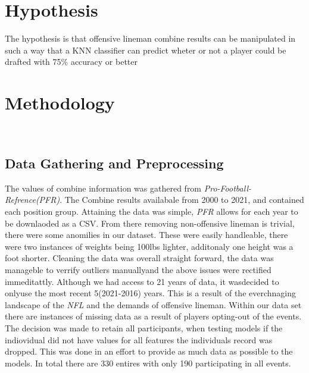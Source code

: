 \documentclass[confrence]{IEEEtran}
\begin{document}
\section*{Hypothesis}
The hypothesis is that offensive lineman combine results can be manipulated in such a way that a KNN classifier can predict wheter or not a player could be drafted with 75\% accuracy or better
\\
\section*{Methodology}
\\
\subsection*{Data Gathering and Preprocessing}
The values of combine information was gathered from \textit{Pro-Football-Refrence(PFR)}.
The Combine results availabale from 2000 to 2021, and contained each position group.
Attaining the data was simple, \textit{PFR} allows for each year to be downlaoded as a CSV.
From there removing non-offensive lineman is trivial, there were some anomilies in our dataset.
These were easily handleable, there were two instances of weights being 100lbs lighter, additonaly one height was a foot shorter.
Cleaning the data was overall straight forward, the data was manageble to verrify outliers manuallyand the above issues were rectified immeditattly.
Although we had access to 21 years of data, it wasdecided to onlyuse the most recent 5(2021-2016) years. This is a result of the everchnaging landscape of the \textit{NFL} and the demands of offensive lineman. 
Within our data set there are instances of missing data as a result of players opting-out of the events. 
The decision was made to retain all participants, when testing models if the indiovidual did not have values for all features the individuals record was dropped.
This was done in an effort to provide as much data as possible to the models. In total there are 330 entires with only 190 participating in all events.
\\
\end{document}
